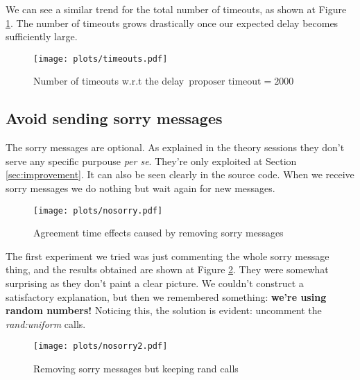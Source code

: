 \documentclass[a4paper, 10pt]{article}
\begin{document}
We can see a similar trend for the total number of timeouts, as shown at Figure \ref{timeouts}. The number of timeouts grows drastically once our expected delay becomes sufficiently large.

\begin{figure}[H]
  \centering
  \texttt{[image: plots/timeouts.pdf]}
    \caption{Number of timeouts w.r.t the delay\   $\text{proposer timeout}=2000$}
    \label{timeouts}
\end{figure} 






\subsection{Avoid sending sorry messages}

The sorry messages are optional. As explained in the theory sessions they don't serve any specific purpouse \textit{per se}. They're only exploited at Section \ref{sec:improvement}. It can also be seen clearly in the source code. When we receive sorry messages we do nothing but wait again for new messages.

\begin{figure}[H]
  \centering
  \texttt{[image: plots/nosorry.pdf]}
    \caption{Agreement time effects caused by removing sorry messages}
    \label{nosorry1}
\end{figure} 
The first experiment we tried was just commenting the whole sorry message thing, and the results obtained are shown at Figure \ref{nosorry1}. They were somewhat surprising as they don't paint a clear picture. We couldn't construct a satisfactory explanation, but then we remembered something: \textbf{we're using random numbers!} Noticing this, the solution is evident: uncomment the \textit{rand:uniform} calls.

\begin{figure}[H]
  \centering
  \texttt{[image: plots/nosorry2.pdf]}
    \caption{Removing sorry messages but keeping rand calls}
\end{figure} 
\end{document}
